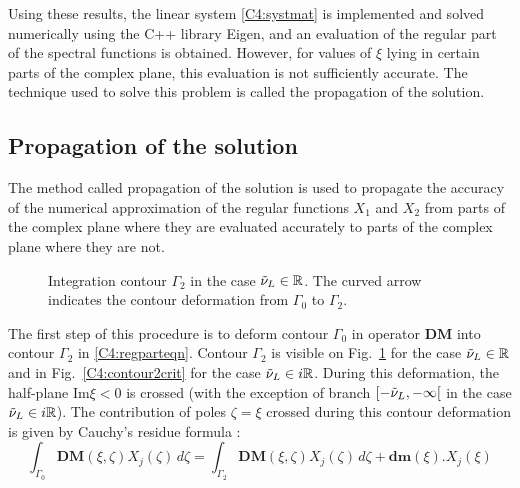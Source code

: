  Using these results, the linear system \eqref{C4:systmat} is implemented and solved numerically using the C++ library Eigen, and an evaluation of the regular part of the spectral functions is obtained. However, for values of $\xi$ lying in certain parts of the complex plane, this evaluation is not sufficiently accurate. The technique used to solve this problem is called the propagation of the solution.
 
\subsection{Propagation of the solution}
\label{C4:propag}
The method called propagation of the solution is used to propagate the accuracy of the numerical approximation of the regular functions $X_1$ and $X_2$ from parts of the complex plane where they are evaluated accurately to parts of the complex plane where they are not.

\begin{figure}[h]
	\centering
	\caption{Integration contour $\Gamma_2$ in the case $\tilde{\nu}_L \in \mathbb{R}$. The curved arrow indicates the contour deformation from $\Gamma_0$ to $\Gamma_2$.}
	\label{C4:contour2}
\end{figure}

The first step of this procedure is to deform contour $\Gamma_0$ in operator $\mathbf{DM}$ into contour $\Gamma_2$ in \eqref{C4:regparteqn}. Contour $\Gamma_2$ is visible on Fig.~\ref{C4:contour2} for the case $\tilde{\nu}_L \in \mathbb{R}$ and in Fig.~\ref{C4:contour2crit} for the case $\tilde{\nu}_L \in i\mathbb{R}$. During this deformation, the half-plane Im$\xi<0$ is crossed (with the exception of branch $\lbrack -\tilde{\nu}_L,-\infty \lbrack$ in the case $\tilde{\nu}_L \in i\mathbb{R}$). The contribution of poles $\zeta=\xi$ crossed during this contour deformation is given by Cauchy's residue formula :
\begin{equation}
\int_{\Gamma_0} \textbf{DM}(\xi,\zeta)X_j(\zeta)\, d\zeta = \int_{\Gamma_2}  \textbf{DM}(\xi,\zeta)X_j(\zeta)\, d\zeta + \textbf{dm}(\xi).X_j(\xi)
\label{C4:DM2}
\end{equation}


